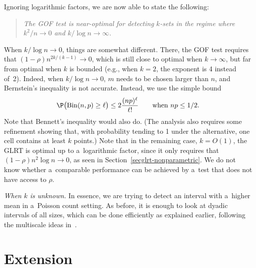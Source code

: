 \documentclass[10pt, oneside]{article}
\begin{document}
Ignoring logarithmic factors, we are now able to state the following:

\begin{quote}
{\normalsize\textit{The GOF test is near-optimal for detecting $k$-sets in
the regime where $k^2/n \to0$ and $k/\log n \to\infty$.}}
\end{quote}

When $k/\log n \to0$, things are somewhat different. There, the GOF
test requires that $(1-\rho) n^{2 k/(k-1)} \to0$, which is still
close to optimal when $k \to\infty$, but far from optimal when $k$ is
bounded (e.g., when $k=2$, the exponent is 4 instead of~2).
Indeed, when $k/\log n \to0$, $m$ needs to be chosen larger than $n$,
and Bernstein's inequality is not accurate. Instead, we use the simple bound
%
\[
\P\bigl(\operatorname{Bin}(n,p) \ge\ell\bigr) \le2 \frac{ (n p)^\ell}{\ell!}
\qquad\mbox{when } n p \le1/2.
\]
%
Note that Bennett's inequality would also do. (The analysis also
requires some refinement showing that, with probability tending to 1
under the alternative, one cell contains at least $k$ points.)
Note that in the remaining case, $k = O(1)$, the GLRT is optimal up to
a~logarithmic factor, since it only requires that $(1-\rho) n^2 \log n
\to0$, as seen in Section~\ref{secglrt-nonparametric}. We do not
know whether
a~comparable performance can be achieved by a~test that does not have
access to $\rho$.

\textit{When $k$ is unknown.} In essence, we are trying to detect an
interval with a~higher mean in a~Poisson count setting.\vadjust{\goodbreak} As before, it
is enough to look at dyadic intervals of all sizes, which can be done
efficiently as explained earlier, following the multiscale ideas
in~\cite{MGD}.

\section{Extension}



\end{document}
